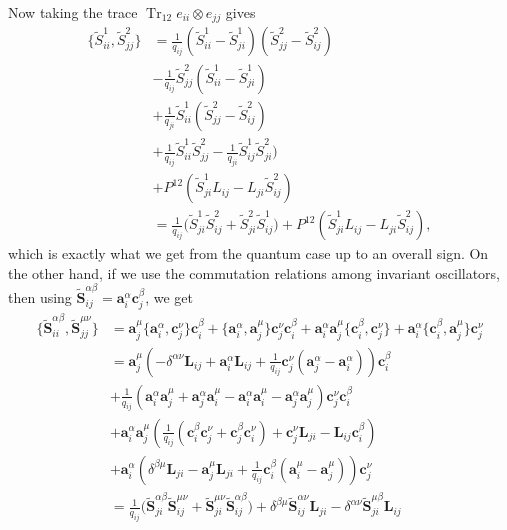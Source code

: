 \documentclass[11pt]{report}
\theoremstyle{definition}
\theoremstyle{remark}
\theoremstyle{remark}
\begin{document}
Now taking the trace $\operatorname{Tr}_{12} e_{ii} \otimes e_{jj}$ gives
\begin{align*}
\{ \tilde S_{ii}^1, \tilde S_{jj}^2 \}
&= \frac{1}{q_{ij}}
(\tilde S_{ii}^1-\tilde S_{ji}^1)(\tilde S_{jj}^2-\tilde S_{ij}^2) \\
&- \frac{1}{q_{ij}}
\tilde S_{jj}^2 (\tilde S_{ii}^1-\tilde S_{ji}^1) \\
&+ \frac{1}{q_{ji}} \tilde S_{ii}^1 (\tilde S_{jj}^2 -\tilde S_{ij}^2) \\
&+\frac{1}{q_{ij}}
\tilde S_{ii}^1 \tilde S_{jj}^2
-\frac{1}{q_{ji}} \tilde S_{ij}^1 \tilde S_{ji}^2) \\
&+ P^{12} (\tilde S_{ji}^1 L_{ij}-L_{ji} \tilde S_{ij}^2) \\
&= \frac{1}{q_{ij}} \bigg( \tilde S_{ji}^1 \tilde S_{ij}^2 + \tilde S_{ji}^2 \tilde S_{ij}^1 \bigg) + P^{12} (\tilde S_{ji}^1 L_{ij}-L_{ji} \tilde S_{ij}^2),
\end{align*}
which is exactly what we get from the quantum case up to an overall sign. On the other hand, if we use the commutation relations among invariant oscillators, then using $\tilde{\mathbf{S}}_{ij}^{\alpha\beta} = \mathbf{a}_i^\alpha \mathbf{c}_j^\beta$, we get
\begin{align*}
\{ \tilde{\mathbf{S}}_{ii}^{\alpha\beta}, \tilde{\mathbf{S}}_{jj}^{\mu\nu} \}
&= \mathbf{a}_j^\mu \{ \mathbf{a}_i^\alpha, \mathbf{c}_j^\nu \} \mathbf{c}_i^\beta + \{ \mathbf{a}_i^\alpha, \mathbf{a}_j^\mu \} \mathbf{c}_j^\nu \mathbf{c}_i^\beta + \mathbf{a}_i^\alpha \mathbf{a}_j^\mu \{ \mathbf{c}_i^\beta, \mathbf{c}_j^\nu \} + \mathbf{a}_i^\alpha \{ \mathbf{c}_i^\beta, \mathbf{a}_j^\mu \} \mathbf{c}_j^\nu \\
&= \mathbf{a}_j^\mu (-\delta^{\alpha\nu} \mathbf{L}_{ij} + \mathbf{a}_i^\alpha \mathbf{L}_{ij} + \frac{1}{q_{ij}} \mathbf{c}_j^\nu (\mathbf{a}_j^\alpha-\mathbf{a}_i^\alpha)) \mathbf{c}_i^\beta \\
&+ \frac{1}{q_{ij}} (\mathbf{a}_i^\alpha \mathbf{a}_j^\mu+\mathbf{a}_j^\alpha \mathbf{a}_i^\mu-\mathbf{a}_i^\alpha \mathbf{a}_i^\mu-\mathbf{a}_j^\alpha \mathbf{a}_j^\mu) \mathbf{c}_j^\nu \mathbf{c}_i^\beta \\
&+ \mathbf{a}_i^\alpha \mathbf{a}_j^\mu (\frac{1}{q_{ij}} (\mathbf{c}_i^\beta \mathbf{c}_j^\nu + \mathbf{c}_j^\beta \mathbf{c}_i^\nu) + \mathbf{c}_j^\nu \mathbf{L}_{ji} - \mathbf{L}_{ij} \mathbf{c}_i^\beta) \\
&+ \mathbf{a}_i^\alpha (\delta^{\beta\mu} \mathbf{L}_{ji} - \mathbf{a}_j^\mu \mathbf{L}_{ji} + \frac{1}{q_{ij}} \mathbf{c}_i^\beta (\mathbf{a}_i^\mu-\mathbf{a}_j^\mu)) \mathbf{c}_j^\nu \\
&= \frac{1}{q_{ij}} \bigg( \tilde{\mathbf{S}}_{ji}^{\alpha\beta} \tilde{\mathbf{S}}_{ij}^{\mu\nu} + \tilde{\mathbf{S}}_{ji}^{\mu\nu} \tilde{\mathbf{S}}_{ij}^{\alpha\beta} \bigg) + \delta^{\beta\mu} \tilde{\mathbf{S}}_{ij}^{\alpha\nu} \mathbf{L}_{ji} - \delta^{\alpha\nu} \tilde{\mathbf{S}}_{ji}^{\mu\beta} \mathbf{L}_{ij} 
\end{align*}
\end{document}
